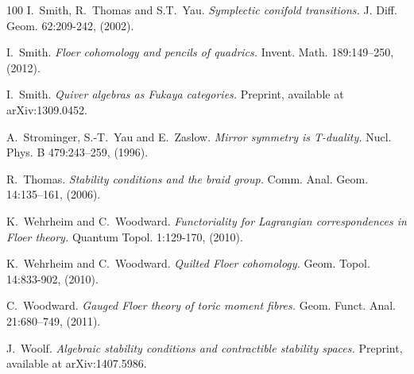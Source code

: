 \documentclass[11pt,a4paper]{article}
\numberwithin{equation}{section}
\begin{document}
\begin{thebibliography}{100}
I.~Smith, R.~Thomas and S.T.~Yau.
\emph{Symplectic conifold transitions.}
J. Diff. Geom. 62:209-242, (2002).

I.~Smith.
\emph{Floer cohomology and pencils of quadrics.}
Invent. Math. 189:149--250, (2012).

I.~Smith.
\emph{Quiver algebras as Fukaya categories.}
Preprint, available at arXiv:1309.0452.

A.~Strominger, S.-T.~Yau and E.~Zaslow.
\emph{Mirror symmetry is T-duality.}
Nucl. Phys. B 479:243--259, (1996).

R.~Thomas.
\emph{Stability conditions and the braid group.}
Comm. Anal. Geom. 14:135--161, (2006).

K.~Wehrheim and C.~Woodward.
\emph{Functoriality for Lagrangian correspondences in Floer theory.}
Quantum Topol. 1:129-170, (2010).

K.~Wehrheim and C.~Woodward.
\emph{Quilted Floer cohomology.}
Geom. Topol. 14:833-902, (2010).

C.~Woodward.
\emph{Gauged Floer theory of toric moment fibres.}
Geom. Funct. Anal. 21:680--749, (2011).

J.~Woolf.
\emph{Algebraic stability conditions and contractible stability spaces.}
Preprint, available at arXiv:1407.5986.

\end{thebibliography}
\end{document}
